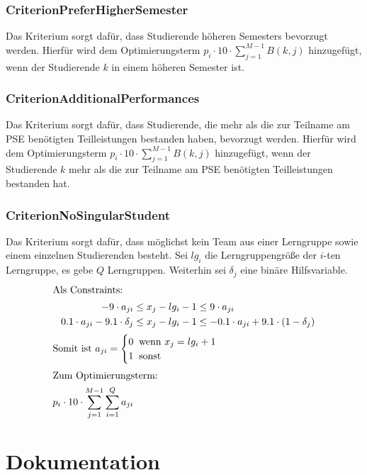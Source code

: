 \documentclass[parskip=full]{scrartcl}
\begin{document}
\subsubsection{CriterionPreferHigherSemester}
Das Kriterium sorgt dafür, dass Studierende höheren Semesters bevorzugt werden.
Hierfür wird dem Optimierungsterm $p_i \cdot 10 \cdot \sum_{j = 1}^{M-1} B(k,j)$ hinzugefügt, wenn der
Studierende $k$ in einem höheren Semester ist.
\subsubsection{CriterionAdditionalPerformances}
Das Kriterium sorgt dafür, dass Studierende, die mehr als die zur Teilname am PSE
benötigten Teilleistungen bestanden haben, bevorzugt werden. Hierfür wird dem Optimierungsterm
$p_i \cdot 10 \cdot \sum_{j = 1}^{M-1} B(k,j)$ hinzugefügt, wenn der Studierende
$k$ mehr als die zur Teilname am PSE benötigten Teilleistungen bestanden hat.
\subsubsection{CriterionNoSingularStudent}
Das Kriterium sorgt dafür, dass möglichst kein Team aus einer Lerngruppe sowie
einem einzelnen Studierenden besteht.
Sei $lg_i$ die Lerngruppengröße der $i$-ten Lerngruppe, es gebe $Q$ Lerngruppen.
Weiterhin sei $\delta_j$ eine binäre Hilfsvariable.
\begin{align*}
\intertext{Als Constraints:} 
-9 \cdot a_{ji} &\le x_j -lg_i -1 \le 9\cdot a_{ji}\\
0.1 \cdot a_{ji} - 9.1 \cdot \delta_j &\le x_j -lg_i -1 \le -0.1 \cdot a_{ji} +
9.1 \cdot (1-\delta_j)\\
\intertext{$\text{Somit ist } a_{ji} = \begin{cases}
    0 \;\; \text{wenn $x_j = lg_i +1$} \\
    1 \;\; \text{sonst} 
\end{cases}$}
\intertext{Zum Optimierungsterm: }
p_i \cdot 10 \cdot \sum_{j = 1}^{M-1} \sum_{i = 1}^{Q}a_{ji}
\end{align*}
\pagebreak
\section{Dokumentation}







\end{document}
